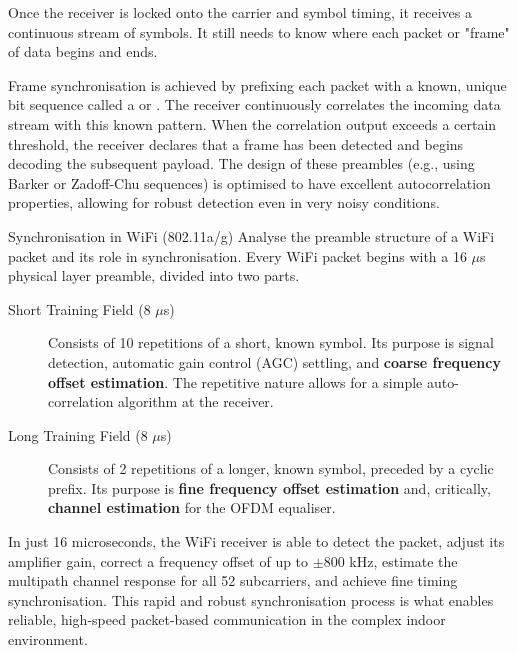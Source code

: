 Once the receiver is locked onto the carrier and symbol timing, it receives a continuous stream of symbols. It still needs to know where each packet or "frame" of data begins and ends.

Frame synchronisation is achieved by prefixing each packet with a known, unique bit sequence called a  or . The receiver continuously correlates the incoming data stream with this known pattern. When the correlation output exceeds a certain threshold, the receiver declares that a frame has been detected and begins decoding the subsequent payload. The design of these preambles (e.g., using Barker or Zadoff-Chu sequences) is optimised to have excellent autocorrelation properties, allowing for robust detection even in very noisy conditions.


\begin{workedexample}{Synchronisation in WiFi (802.11a/g)}
     Analyse the preamble structure of a WiFi packet and its role in synchronisation.
    Every WiFi packet begins with a 16 $\mu$s physical layer preamble, divided into two parts.
    \begin{description}
        \item[Short Training Field (8 $\mu$s)] Consists of 10 repetitions of a short, known symbol. Its purpose is signal detection, automatic gain control (AGC) settling, and \textbf{coarse frequency offset estimation}. The repetitive nature allows for a simple auto-correlation algorithm at the receiver.
        \item[Long Training Field (8 $\mu$s)] Consists of 2 repetitions of a longer, known symbol, preceded by a cyclic prefix. Its purpose is \textbf{fine frequency offset estimation} and, critically, \textbf{channel estimation} for the OFDM equaliser.
    \end{description}
     In just 16 microseconds, the WiFi receiver is able to detect the packet, adjust its amplifier gain, correct a frequency offset of up to $\pm$800 kHz, estimate the multipath channel response for all 52 subcarriers, and achieve fine timing synchronisation. This rapid and robust synchronisation process is what enables reliable, high-speed packet-based communication in the complex indoor environment.
\end{workedexample}


